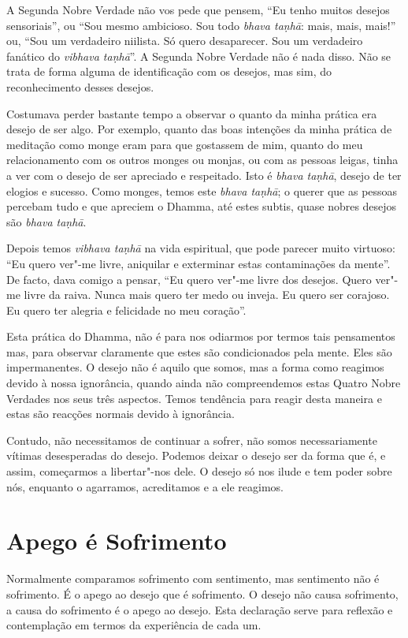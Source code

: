 A Segunda Nobre Verdade não vos pede que pensem, “Eu tenho muitos desejos
sensoriais”, ou “Sou mesmo ambicioso. Sou todo \emph{bhava taṇhā}: mais, mais,
mais!” ou, “Sou um verdadeiro niilista. Só quero desaparecer. Sou um verdadeiro
fanático do \emph{vibhava taṇhā}”. A Segunda Nobre Verdade não é nada disso. Não
se trata de forma alguma de identificação com os desejos, mas sim, do
reconhecimento desses desejos.

Costumava perder bastante tempo a observar o quanto da minha prática era desejo
de ser algo. Por exemplo, quanto das boas intenções da minha prática de
meditação como monge eram para que gostassem de mim, quanto do meu
relacionamento com os outros monges ou monjas, ou com as pessoas leigas, tinha a
ver com o desejo de ser apreciado e respeitado. Isto é \emph{bhava taṇhā},
desejo de ter elogios e sucesso. Como monges, temos este \emph{bhava taṇhā}; o
querer que as pessoas percebam tudo e que apreciem o Dhamma, até estes subtis,
quase nobres desejos são \emph{bhava taṇhā}.

Depois temos \emph{vibhava taṇhā} na vida espiritual, que pode parecer muito
virtuoso: “Eu quero ver"-me livre, aniquilar e exterminar estas contaminações da
mente”. De facto, dava comigo a pensar, “Eu quero ver"-me livre dos desejos.
Quero ver"-me livre da raiva. Nunca mais quero ter medo ou inveja. Eu quero ser
corajoso. Eu quero ter alegria e felicidade no meu coração”.

Esta prática do Dhamma, não é para nos odiarmos por termos tais pensamentos mas,
para observar claramente que estes são condicionados pela mente. Eles são
impermanentes. O desejo não é aquilo que somos, mas a forma como reagimos devido
à nossa ignorância, quando ainda não compreendemos estas Quatro Nobre Verdades
nos seus três aspectos. Temos tendência para reagir desta maneira e estas são
reacções normais devido à ignorância.

Contudo, não necessitamos de continuar a sofrer, não somos necessariamente
vítimas desesperadas do desejo. Podemos deixar o desejo ser da forma que é, e
assim, começarmos a libertar"-nos dele. O desejo só nos ilude e tem poder sobre
nós, enquanto o agarramos, acreditamos e a ele reagimos.

\section{Apego é Sofrimento}

Normalmente comparamos sofrimento com sentimento, mas sentimento não é
sofrimento. É o apego ao desejo que é sofrimento. O desejo não causa sofrimento,
a causa do sofrimento é o apego ao desejo. Esta declaração serve para reflexão e
contemplação em termos da experiência de cada um.

